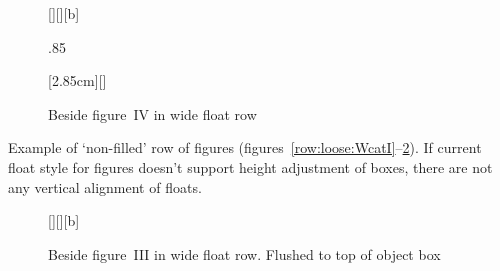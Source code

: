 \begin{figure}[!t]
\begin{floatrow}[4]
{\caption{Beside figure~I in wide float row. Vertically centered\protect\footnotemark[1]}%
\label{row:full:WcatI}}%

[\FBwidth][][b]
{\caption{Beside figure~II in wide float row. Flushed to bottom of box}%
\label{row:full:BcatI}%
}%
{\unitlength.85\unitlength\ifx\pspicture\undefined\else{}\fi
}%

%
{\caption{Beside figure~III in wide float row. Flushed to top of object box}%
\label{row:full:mouseI}}%

[2.85cm][\textwidth]%
{\caption{Beside figure~IV in wide float row}\label{row:full:FcatI}}%
{\Resizebox\hsize{}}%
\end{floatrow}\vspace{-8pt}
\end{figure}

\Text

\ifTwocolumn\else
\clearpage
Example of `non-filled' row of figures
(figures~\ref{row:loose:WcatI}--\ref{row:loose:mouseI}).
If current float style for figures doesn't support height adjustment of boxes,
there are not any vertical alignment of floats.

\begin{figure}

\begin{floatrow}[3]
{\caption{Beside figure~I in wide float row. Vertically centered\protect\footnotemark[1]}%
\label{row:loose:WcatI}}%

[\FBwidth][][b]
{\caption{Beside figure~II, width of graphics, bottom of object box}%
\label{row:loose:BcatI}%
}%
{\unitlength\ifx\pspicture\undefined\else{}\fi
}%

{\caption{Beside figure~III in wide float row. Flushed to top of object box}%
\label{row:loose:mouseI}}%
\end{floatrow}
\end{figure}

